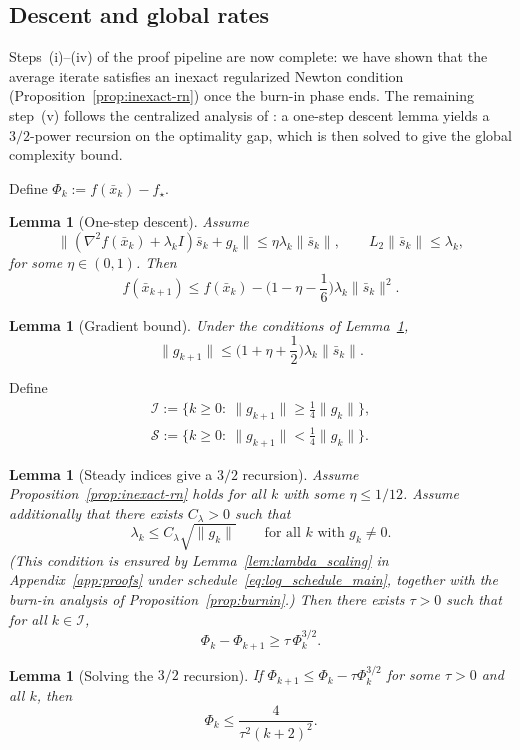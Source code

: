 \documentclass[10pt,twocolumn,letterpaper]{article}
\theoremstyle{compact}
\newtheorem{lemma}[theorem]{Lemma}
\theoremstyle{compactremark}
\begin{document}
\subsection{Descent and global rates}\label{ssec:descent}
Steps~(i)--(iv) of the proof pipeline are now complete: we have shown
that the average iterate satisfies an inexact regularized Newton
condition (Proposition~\ref{prop:inexact-rn}) once the burn-in phase
ends.
The remaining step~(v) follows the centralized analysis of
\citet{mishchenko2023rn}: a one-step descent lemma yields a
$3/2$-power recursion on the optimality gap, which is then solved to
give the global complexity bound.

Define $\Phi_k:=f(\bar x_k)-f_\star$.

\begin{lemma}[One-step descent]\label{lem:descent}
Assume
\[
\|(\nabla^2 f(\bar x_k)+\lambda_k I)\bar s_k+g_k\|\le \eta\lambda_k\|\bar s_k\|,
\qquad
L_2\|\bar s_k\|\le \lambda_k,
\]
for some $\eta\in(0,1)$.
Then
\[
f(\bar x_{k+1})\le f(\bar x_k) - \Big(1-\eta-\frac{1}{6}\Big)\lambda_k\|\bar s_k\|^2.
\]
\end{lemma}

\begin{lemma}[Gradient bound]\label{lem:grad_bound}
Under the conditions of Lemma~\ref{lem:descent},
\[
\|g_{k+1}\|\le \Big(1+\eta+\frac{1}{2}\Big)\lambda_k\|\bar s_k\|.
\]
\end{lemma}

Define
\begin{gather*}
\mathcal I:=\{k\ge0:\ \|g_{k+1}\|\ge \tfrac14\|g_k\|\},\\
\mathcal S:=\{k\ge0:\ \|g_{k+1}\|< \tfrac14\|g_k\|\}.
\end{gather*}

\begin{lemma}[Steady indices give a $3/2$ recursion]\label{lem:steady}
Assume Proposition~\ref{prop:inexact-rn} holds for all $k$ with some $\eta\le 1/12$.
Assume additionally that there exists $C_\lambda>0$ such that
\[
\lambda_k\le C_\lambda\sqrt{\|g_k\|}\qquad\text{for all $k$ with $g_k\neq 0$}.
\]
(This condition is ensured by Lemma~\ref{lem:lambda_scaling}
in Appendix~\ref{app:proofs} under
schedule~\eqref{eq:log_schedule_main}, together with the burn-in
analysis of Proposition~\ref{prop:burnin}.)
Then there exists $\tau>0$ such that for all $k\in\mathcal I$,
\[
\Phi_k-\Phi_{k+1}\ge \tau\,\Phi_k^{3/2}.
\]
\end{lemma}

\begin{lemma}[Solving the $3/2$ recursion]\label{lem:solve32}
If $\Phi_{k+1}\le \Phi_k-\tau\Phi_k^{3/2}$ for some $\tau>0$ and all $k$, then
\[
\Phi_k\le \frac{4}{\tau^2(k+2)^2}.
\]
\end{lemma}
\end{document}
